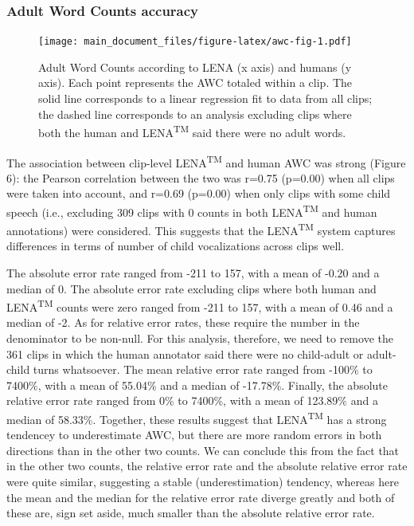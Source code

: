 \documentclass[english,table,man,floatsintext]{apa6}
\begin{document}
\hypertarget{adult-word-counts-accuracy}{%
\subsubsection{Adult Word Counts accuracy}\label{adult-word-counts-accuracy}}

\begin{figure}
\centering
\texttt{[image: main\_document\_files/figure-latex/awc-fig-1.pdf]}
\caption{\label{fig:awc-fig}Adult Word Counts according to LENA (x axis) and humans (y axis). Each point represents the AWC totaled within a clip. The solid line corresponds to a linear regression fit to data from all clips; the dashed line corresponds to an analysis excluding clips where both the human and LENA\textsuperscript{TM} said there were no adult words.}
\end{figure}

The association between clip-level LENA\textsuperscript{TM} and human AWC was strong (Figure 6): the Pearson correlation between the two was r=0.75 (p=0.00) when all clips were taken into account, and r=0.69 (p=0.00) when only clips with some child speech (i.e., excluding 309 clips with 0 counts in both LENA\textsuperscript{TM} and human annotations) were considered. This suggests that the LENA\textsuperscript{TM} system captures differences in terms of number of child vocalizations across clips well.

The absolute error rate ranged from -211 to 157, with a mean of -0.20 and a median of 0. The absolute error rate excluding clips where both human and LENA\textsuperscript{TM} counts were zero ranged from -211 to 157, with a mean of 0.46 and a median of -2. As for relative error rates, these require the number in the denominator to be non-null. For this analysis, therefore, we need to remove the 361 clips in which the human annotator said there were no child-adult or adult-child turns whatsoever. The mean relative error rate ranged from -100\% to 7400\%, with a mean of 55.04\% and a median of -17.78\%. Finally, the absolute relative error rate ranged from 0\% to 7400\%, with a mean of 123.89\% and a median of 58.33\%. Together, these results suggest that LENA\textsuperscript{TM} has a strong tendencey to underestimate AWC, but there are more random errors in both directions than in the other two counts. We can conclude this from the fact that in the other two counts, the relative error rate and the absolute relative error rate were quite similar, suggesting a stable (underestimation) tendency, whereas here the mean and the median for the relative error rate diverge greatly and both of these are, sign set aside, much smaller than the absolute relative error rate.
\end{document}
